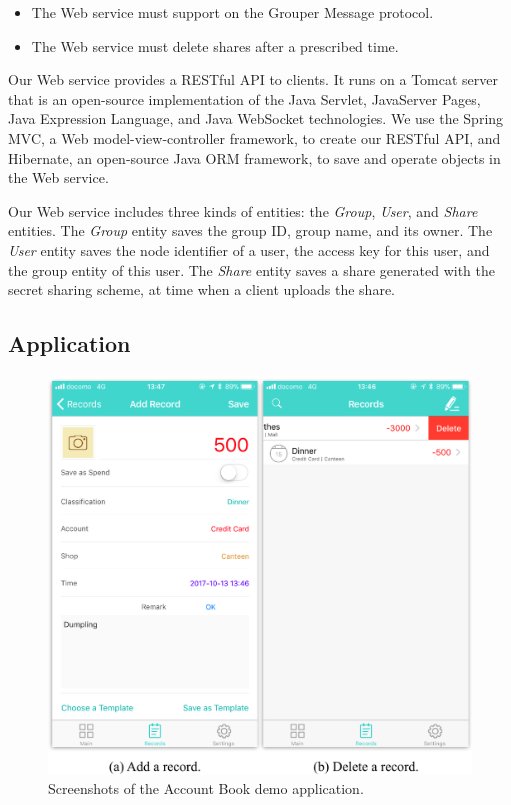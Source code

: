\documentclass[sigconf]{acmart}
\begin{document}
\begin{itemize}
	\setlength{\itemsep}{1pt}
	\setlength{\parskip}{0pt}
	\setlength{\parsep}{0pt}
	\item The Web service must support on the Grouper Message protocol.
	\item The Web service must delete shares after a prescribed time.
\end{itemize}

Our Web service provides a RESTful API to clients.
It runs on a Tomcat server\cite{tomcat} that is an open-source implementation of the Java Servlet, JavaServer Pages, Java Expression Language, and Java WebSocket technologies. 
We use the Spring MVC\cite{spring}, a Web model-view-controller framework, to create our RESTful API, and Hibernate\cite{hibernate}, an open-source Java ORM framework, to save and operate objects in the Web service. 

Our Web service includes three kinds of entities: the \emph{Group}, \emph{User}, and \emph{Share} entities. 
The \emph{Group} entity saves the group ID, group name, and its owner. 
The \emph{User} entity saves the node identifier of a user, the access key for this user, and the group entity of this user. 
The \emph{Share} entity saves a share generated with the secret sharing scheme, at time when a client uploads the share. 

\subsection{Application}

\begin{figure}[t]
	\centering
	\includegraphics[scale=0.5]{account_book}
	\caption{Screenshots of the Account Book demo application.}
\end{figure}
\end{document}
